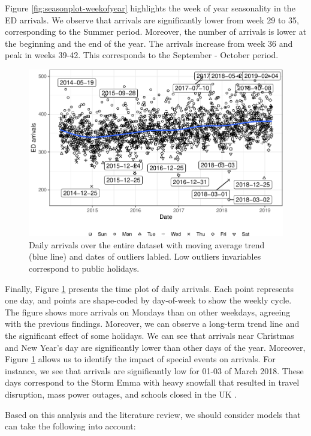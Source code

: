 \documentclass[]{elsarticle} %
\begin{document}
Figure \ref{fig:seasonplot-weekofyear} highlights the week of year seasonality in the ED arrivals. We observe that arrivals are significantly lower from week 29 to 35, corresponding to the Summer period. Moreover, the number of arrivals is lower at the beginning and the end of the year. The arrivals increase from week 36 and peak in weeks 39-42. This corresponds to the September - October period.

\begin{figure}[H]

{\centering \includegraphics[width=0.7\linewidth]{paper_files/figure-latex/date-plot-1} 

}

\caption{Daily arrivals over the entire dataset with moving average trend (blue line) and dates of outliers labled. Low outliers invariables correspond to public holidays.}\label{fig:date-plot}
\end{figure}

Finally, Figure \ref{fig:date-plot} presents the time plot of daily arrivals. Each point represents one day, and points are shape-coded by day-of-week to show the weekly cycle. The figure shows more arrivals on Mondays than on other weekdays, agreeing with the previous findings. Moreover, we can observe a long-term trend line and the significant effect of some holidays. We can see that arrivals near Christmas and New Year's day are significantly lower than other days of the year. Moreover, Figure \ref{fig:date-plot} allows us to identify the impact of special events on arrivals. For instance, we see that arrivals are significantly low for 01-03 of March 2018. These days correspond to the Storm Emma with heavy snowfall that resulted in travel disruption, mass power outages, and schools closed in the UK \citep{stormemma2018}.

Based on this analysis and the literature review, we should consider models that can take the following into account:
\end{document}
